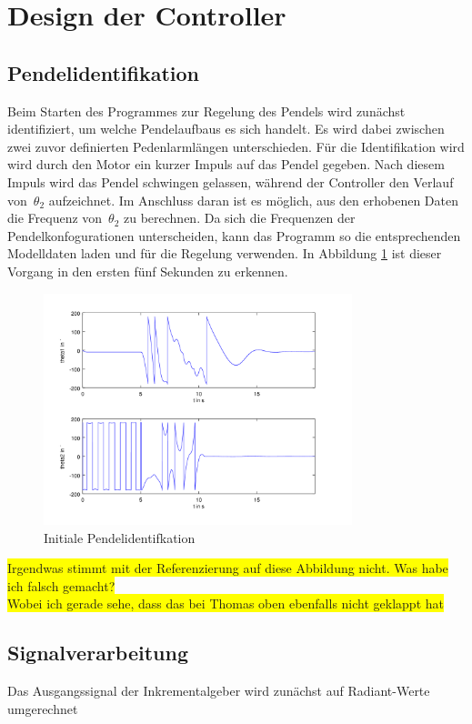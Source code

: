 \section{Design der Controller}
\subsection{Pendelidentifikation}
Beim Starten des Programmes zur Regelung des Pendels wird zunächst identifiziert, um welche Pendelaufbaus es sich handelt. Es wird dabei zwischen zwei zuvor definierten Pedenlarmlängen unterschieden.
Für die Identifikation wird wird durch den Motor ein kurzer Impuls auf das Pendel gegeben. Nach diesem Impuls wird das Pendel schwingen gelassen, während der Controller den Verlauf von~$\theta_2$ aufzeichnet. Im Anschluss daran ist es möglich, aus den erhobenen Daten die Frequenz von~$\theta_2$ zu berechnen. Da sich die Frequenzen der Pendelkonfogurationen unterscheiden, kann das Programm so die entsprechenden Modelldaten laden und für die Regelung verwenden. In Abbildung \ref{fig.Identifikation} ist dieser Vorgang in den ersten fünf Sekunden zu erkennen.

\begin{figure}[htbp]
	\centering	
	\label{fig.Identifikation}
	\includegraphics[width=0.8\textwidth]{Grafiken/Swing-Up_kurz.png}
	\caption{Initiale Pendelidentifkation}
\end{figure}
\colorbox{yellow}{Irgendwas stimmt mit der Referenzierung auf diese Abbildung nicht. Was habe ich falsch gemacht?} \\
\colorbox{yellow}{Wobei ich gerade sehe, dass das bei Thomas oben ebenfalls nicht geklappt hat}



\label{sec.Controller}
\subsection{Signalverarbeitung}
\label{signalverarbeitung} 
Das Ausgangssignal der Inkrementalgeber wird zunächst auf Radiant-Werte umgerechnet 

